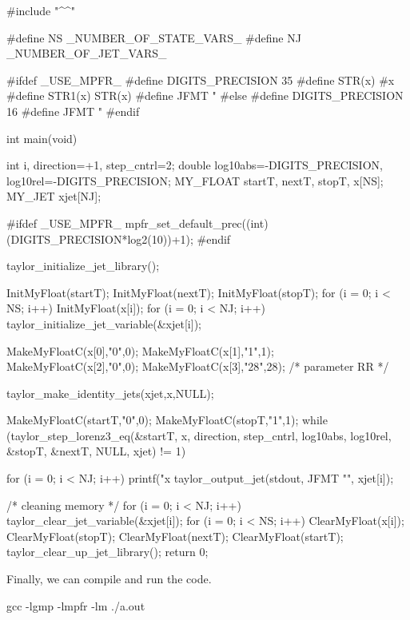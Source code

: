 \documentclass[10pt]{article}
\theoremstyle{remark}
\newcommand{\mainfile}{}
\newcommand{\odecfile}{}
\newcommand{\odehfile}{}
\begin{document}
\begin{code}[title={File: \mainfile{}}]
    #include "^\odehfile{}^"
        
    #define NS _NUMBER_OF_STATE_VARS_
    #define NJ _NUMBER_OF_JET_VARS_
    
    #ifdef _USE_MPFR_
    #define DIGITS_PRECISION 35
    #define STR(x) #x
    #define STR1(x) STR(x)
    #define JFMT "%
    #else 
    #define DIGITS_PRECISION 16
    #define JFMT "%
    #endif
    
    int main(void)
    {
      int i, direction=+1, step_cntrl=2;
      double log10abs=-DIGITS_PRECISION, log10rel=-DIGITS_PRECISION;
      MY_FLOAT startT, nextT, stopT, x[NS];
      MY_JET xjet[NJ];
      
    #ifdef _USE_MPFR_
      mpfr_set_default_prec((int)(DIGITS_PRECISION*log2(10))+1);
    #endif
      
      taylor_initialize_jet_library();
      
      InitMyFloat(startT); InitMyFloat(nextT); InitMyFloat(stopT);
      for (i = 0; i < NS; i++) {InitMyFloat(x[i]);}    
      for (i = 0; i < NJ; i++) {taylor_initialize_jet_variable(&xjet[i]);}
      
      MakeMyFloatC(x[0],"0",0);
      MakeMyFloatC(x[1],"1",1);
      MakeMyFloatC(x[2],"0",0); 
      MakeMyFloatC(x[3],"28",28); /* parameter RR */
      
      taylor_make_identity_jets(xjet,x,NULL);
      
      MakeMyFloatC(startT,"0",0);
      MakeMyFloatC(stopT,"1",1);
      while (taylor_step_lorenz3_eq(&startT, x, direction, 
                                    step_cntrl, log10abs, log10rel, 
                                    &stopT, &nextT, NULL, xjet) != 1) {}
      
      for (i = 0; i < NJ; i++) {
        printf("x%
        taylor_output_jet(stdout, JFMT "\n", xjet[i]);
      }
      
      /* cleaning memory */
      for (i = 0; i < NJ; i++) {taylor_clear_jet_variable(&xjet[i]);}
      for (i = 0; i < NS; i++)  {ClearMyFloat(x[i]);}
      ClearMyFloat(stopT); ClearMyFloat(nextT); ClearMyFloat(startT); 
      taylor_clear_up_jet_library();
      return 0;
    } 
\end{code}
Finally, we can compile and run the code.
\begin{command}
    gcc \mainfile{} \odecfile{} -lgmp -lmpfr -lm
    ./a.out
\end{command}
\end{document}
